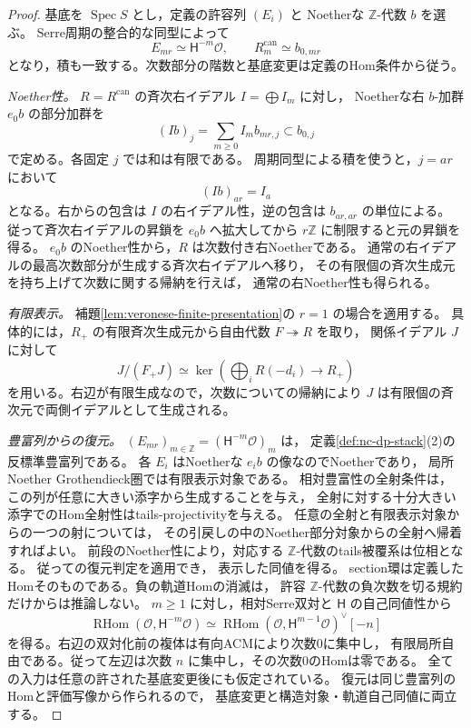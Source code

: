 \begin{proof}
基底を $\operatorname{Spec}S$ とし，定義の許容列 $(E_i)$ と
Noetherな $\mathbb Z$-代数 $b$ を選ぶ。
Serre周期の整合的な同型によって
\[
 E_{mr}\simeq\mathsf H^{-m}\mathcal O,
 \qquad R^{\mathrm{can}}_m\simeq b_{0,mr}
\]
となり，積も一致する。次数部分の階数と基底変更は定義のHom条件から従う。

\emph{Noether性。}
$R=R^{\mathrm{can}}$ の斉次右イデアル $I=\bigoplus I_m$ に対し，
Noetherな右 $b$-加群 $e_0b$ の部分加群を
\[
 (Ib)_j=\sum_{m\ge0}I_m b_{mr,j}\subset b_{0,j}
\]
で定める。各固定 $j$ では和は有限である。
周期同型による積を使うと，$j=ar$ において
\[
                       (Ib)_{ar}=I_a
\]
となる。右からの包含は $I$ の右イデアル性，逆の包含は $b_{ar,ar}$ の単位による。
従って斉次右イデアルの昇鎖を $e_0b$ へ拡大してから
$r\mathbb Z$ に制限すると元の昇鎖を得る。
$e_0b$ のNoether性から，$R$ は次数付き右Noetherである。
通常の右イデアルの最高次数部分が生成する斉次右イデアルへ移り，
その有限個の斉次生成元を持ち上げて次数に関する帰納を行えば，
通常の右Noether性も得られる。

\emph{有限表示。}
補題\ref{lem:veronese-finite-presentation}の $r=1$ の場合を適用する。
具体的には，$R_+$ の有限斉次生成元から自由代数 $F\twoheadrightarrow R$ を取り，
関係イデアル $J$ に対して
\[
 J/(F_+J)\simeq
 \ker\left(\bigoplus_iR(-d_i)\longrightarrow R_+\right)
\]
を用いる。右辺が有限生成なので，次数についての帰納により
$J$ は有限個の斉次元で両側イデアルとして生成される。

\emph{豊富列からの復元。}
$(E_{mr})_{m\in\mathbb Z}=(\mathsf H^{-m}\mathcal O)_m$ は，
定義\ref{def:nc-dp-stack}(2)の反標準豊富列である。
各 $E_i$ はNoetherな $e_ib$ の像なのでNoetherであり，
局所Noether Grothendieck圏では有限表示対象である。
相対豊富性の全射条件は，この列が任意に大きい添字から生成することを与え，
全射に対する十分大きい添字でのHom全射性はtails-projectivityを与える。
任意の全射と有限表示対象からの一つの射については，
その引戻しの中のNoether部分対象からの全射へ帰着すればよい。
前段のNoether性により，対応する $\mathbb Z$-代数のtails被覆系は位相となる。
従って\cite[\S3.3, Corollary~3.16]{DDL2011}の復元判定を適用でき，
表示した同値を得る。
section環は定義したHomそのものである。負の軌道Homの消滅は，
許容 $\mathbb Z$-代数の負次数を切る規約だけからは推論しない。
$m\ge1$ に対し，相対Serre双対と $\mathsf H$ の自己同値性から
\[
 \operatorname{RHom}(\mathcal O,\mathsf H^{-m}\mathcal O)
 \simeq
 \operatorname{RHom}(\mathcal O,\mathsf H^{m-1}\mathcal O)^\vee[-n]
\]
を得る。右辺の双対化前の複体は有向ACMにより次数0に集中し，
有限局所自由である。従って左辺は次数 $n$ に集中し，その次数0のHomは零である。
全ての入力は任意の許された基底変更後にも仮定されている。
復元は同じ豊富列のHomと評価写像から作られるので，
基底変更と構造対象・軌道自己同値に両立する。
\end{proof}

